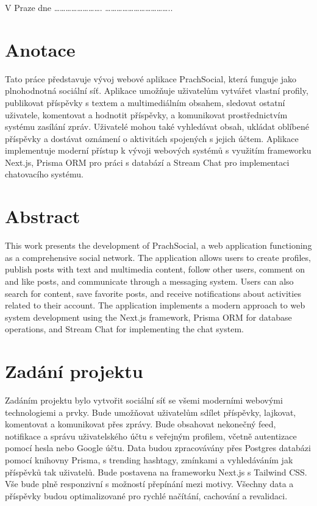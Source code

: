 \documentclass[12pt]{article}
\begin{document}
V Praze dne ……………………. \hspace{30pt}  ……………………………..

\newpage
\thispagestyle{empty}

\section*{Anotace}
Tato práce představuje vývoj webové aplikace PrachSocial, která funguje jako plnohodnotná sociální síť. Aplikace umožňuje uživatelům vytvářet vlastní profily, publikovat příspěvky s textem a multimediálním obsahem, sledovat ostatní uživatele, komentovat a hodnotit příspěvky, a komunikovat prostřednictvím systému zasílání zpráv. Uživatelé mohou také vyhledávat obsah, ukládat oblíbené příspěvky a dostávat oznámení o aktivitách spojených s jejich účtem. Aplikace implementuje moderní přístup k vývoji webových systémů s využitím frameworku Next.js, Prisma ORM pro práci s databází a Stream Chat pro implementaci chatovacího systému.

\section*{Abstract}
This work presents the development of PrachSocial, a web application functioning as a comprehensive social network. The application allows users to create profiles, publish posts with text and multimedia content, follow other users, comment on and like posts, and communicate through a messaging system. Users can also search for content, save favorite posts, and receive notifications about activities related to their account. The application implements a modern approach to web system development using the Next.js framework, Prisma ORM for database operations, and Stream Chat for implementing the chat system.

\newpage
\thispagestyle{empty}
\section*{Zadání projektu}
Zadáním projektu bylo vytvořit sociální síť se všemi moderními webovými technologiemi a prvky. Bude umožňovat uživatelům sdílet příspěvky, lajkovat, komentovat a komunikovat přes zprávy. Bude obsahovat nekonečný feed, notifikace a správu uživatelského účtu s veřejným profilem, včetně autentizace pomocí hesla nebo Google účtu. Data budou zpracovávány přes Postgres databázi pomocí knihovny Prisma, s trending hashtagy, zmínkami a vyhledáváním jak příspěvků tak uživatelů. Bude postavena na frameworku Next.js s Tailwind CSS. Vše bude plně responzivní s možností přepínání mezi motivy. Všechny data a příspěvky budou optimalizované pro rychlé načítání, cachování a revalidaci.
\end{document}
